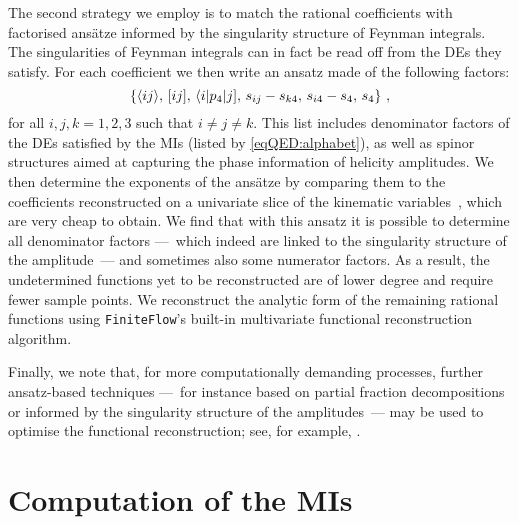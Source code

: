 \documentclass[main.tex]{subfiles}
\begin{document}
The second strategy we employ is to match the rational coefficients with factorised ans\"atze informed by the singularity structure of Feynman integrals. The singularities of Feynman integrals can in fact be read off from the DEs they satisfy. For each coefficient we then write an ansatz made of the following factors:
\begin{equation}
	\left\{\langle ij \rangle , \, [ ij ] , \, \langle i|p_4|j] , \, s_{ij} - s_{k4} , \, s_{i4} - s_4 , \, s_4 \right\} \,,
\end{equation}
for all $i, j, k = 1, 2, 3$ such that $i\neq j \neq k$. This list includes denominator factors of the DEs satisfied by the MIs (listed by \cref{eqQED:alphabet}), 
as well as spinor structures aimed at capturing the phase information of helicity amplitudes.
We then determine the exponents of the ans\"atze by comparing them to the coefficients reconstructed on a univariate slice of the kinematic variables~\cite{Abreu:2019odu}, which are very cheap to obtain. We find that with this ansatz it is possible to determine all denominator factors ---~which indeed are linked to the singularity structure of the amplitude~--- and sometimes also some numerator factors. As a result, the undetermined functions yet to be reconstructed are of lower degree and require fewer sample points. 
We reconstruct the analytic form of the remaining rational functions using \texttt{FiniteFlow}'s built-in multivariate functional reconstruction algorithm.

Finally, we note that, for more computationally demanding processes, further ansatz-based techniques ---~for instance based on 
partial fraction decompositions or informed by the singularity structure of the amplitudes~--- may be used to optimise 
the functional reconstruction; see, for example, .

\section{Computation of the \aclp{MI}}
\label{secQED:spec-fns}
\end{document}
